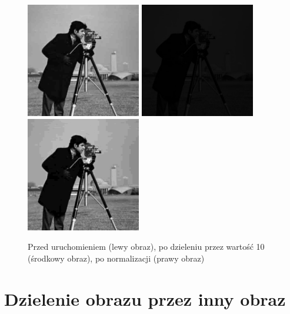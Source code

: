 \documentclass[a4paper,12pt]{book}
\begin{document}
\begin{figure}[H]
	\caption{Przed uruchomieniem (lewy obraz), po dzieleniu przez wartość 10 (środkowy obraz), po normalizacji (prawy obraz)}
	\includegraphics[width=5cm, height=5cm]{man-unmodified.jpg}
	\includegraphics[width=5cm, height=5cm]{2-5/divide-gray-const-photoman-10.png}
	\includegraphics[width=5cm, height=5cm]{2-5/divide-gray-const-photoman-10-norm.png}
\end{figure}

\section{Dzielenie obrazu przez inny obraz}
\end{document}
